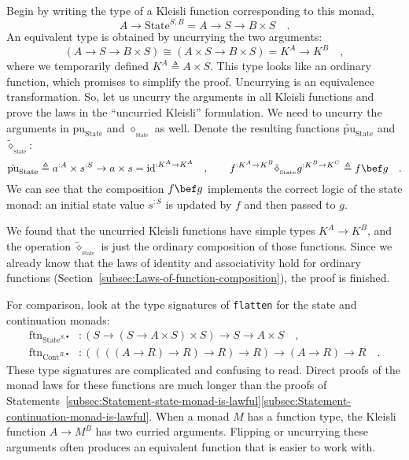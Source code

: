 Begin by writing the type of a Kleisli function corresponding to this
monad,
\[
A\rightarrow\text{State}^{S,B}=A\rightarrow S\rightarrow B\times S\quad.
\]
An equivalent type is obtained by uncurrying the two arguments:
\[
\left(A\rightarrow S\rightarrow B\times S\right)\cong\left(A\times S\rightarrow B\times S\right)=K^{A}\rightarrow K^{B}\quad,
\]
where we temporarily defined $K^{A}\triangleq A\times S$. This type
looks like an ordinary function, which promises to simplify the proof.
Uncurrying is an equivalence transformation. So, let us uncurry the
arguments in all Kleisli functions and prove the laws in the \textsf{``}uncurried
Kleisli\textsf{''} formulation. We need to uncurry the arguments in $\text{pu}_{\text{State}}$
and $\diamond_{_{\text{State}}}$ as well. Denote the resulting functions
$\tilde{\text{pu}}_{\text{State}}$ and $\tilde{\diamond}_{_{\text{State}}}$:
\[
\tilde{\text{pu}}_{\text{State}}\triangleq a^{:A}\times s^{:S}\rightarrow a\times s=\text{id}^{:K^{A}\rightarrow K^{A}}\quad,\quad\quad f^{:K^{A}\rightarrow K^{B}}\tilde{\diamond}_{_{\text{State}}}g^{:K^{B}\rightarrow K^{C}}\triangleq f\bef g\quad.
\]
We can see that the composition $f\bef g$ implements the correct
logic of the state monad: an initial state value $s^{:S}$ is updated
by $f$ and then passed to $g$.

We found that the uncurried Kleisli functions have simple types $K^{A}\rightarrow K^{B}$,
and the operation $\tilde{\diamond}_{_{\text{State}}}$ is just the
ordinary composition of those functions. Since we already know that
the laws of identity and associativity hold for ordinary functions
(Section~\ref{subsec:Laws-of-function-composition}), the proof is
finished.

For comparison, look at the type signatures of \lstinline!flatten!
for the state and continuation monads:
\begin{align*}
\text{ftn}_{\text{State}^{S,\bullet}} & :\left(S\rightarrow\left(S\rightarrow A\times S\right)\times S\right)\rightarrow S\rightarrow A\times S\quad,\\
\text{ftn}_{\text{Cont}^{R,\bullet}} & :\left(\left(\left(\left(A\rightarrow R\right)\rightarrow R\right)\rightarrow R\right)\rightarrow R\right)\rightarrow\left(A\rightarrow R\right)\rightarrow R\quad.
\end{align*}
These type signatures are complicated and confusing to read. Direct
proofs of the monad laws for these functions are much longer than
the proofs of Statements~\ref{subsec:Statement-state-monad-is-lawful}\textendash \ref{subsec:Statement-continuation-monad-is-lawful}.
When a monad $M$ has a function type, the Kleisli function $A\rightarrow M^{B}$
has two curried arguments. Flipping or uncurrying these arguments
often produces an equivalent function that is easier to work with. 

